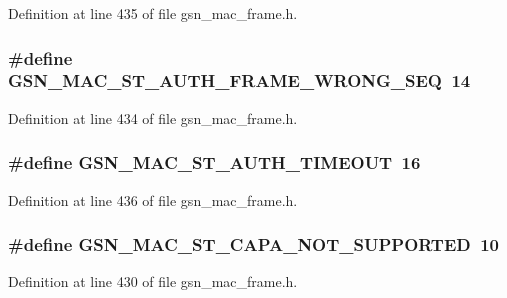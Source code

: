 Definition at line 435 of file gsn\_\-mac\_\-frame.h.

\hypertarget{a00523_a9a09aaac9fdcc63e3bebc7c874242373}{
\subsubsection[{GSN\_\-MAC\_\-ST\_\-AUTH\_\-FRAME\_\-WRONG\_\-SEQ}]{\setlength{\rightskip}{0pt plus 5cm}\#define GSN\_\-MAC\_\-ST\_\-AUTH\_\-FRAME\_\-WRONG\_\-SEQ~14}}
\label{a00523_a9a09aaac9fdcc63e3bebc7c874242373}


Definition at line 434 of file gsn\_\-mac\_\-frame.h.

\hypertarget{a00523_addb17130bf92ab6b55e8641c725a7243}{
\subsubsection[{GSN\_\-MAC\_\-ST\_\-AUTH\_\-TIMEOUT}]{\setlength{\rightskip}{0pt plus 5cm}\#define GSN\_\-MAC\_\-ST\_\-AUTH\_\-TIMEOUT~16}}
\label{a00523_addb17130bf92ab6b55e8641c725a7243}


Definition at line 436 of file gsn\_\-mac\_\-frame.h.

\hypertarget{a00523_a72ff1d1c2cb9a51d84ec21d6e2a47bf5}{
\subsubsection[{GSN\_\-MAC\_\-ST\_\-CAPA\_\-NOT\_\-SUPPORTED}]{\setlength{\rightskip}{0pt plus 5cm}\#define GSN\_\-MAC\_\-ST\_\-CAPA\_\-NOT\_\-SUPPORTED~10}}
\label{a00523_a72ff1d1c2cb9a51d84ec21d6e2a47bf5}


Definition at line 430 of file gsn\_\-mac\_\-frame.h.


